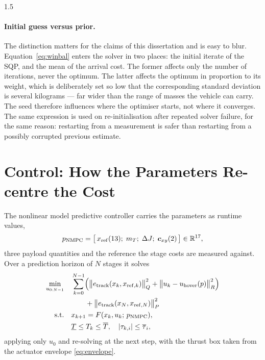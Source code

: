 \begin{spacing}{1.5}
\paragraph{Initial guess versus prior.} The distinction matters for the claims of
this dissertation and is easy to blur. Equation~\eqref{eq:winbal} enters the
solver in two places: the initial iterate of the SQP, and the mean of the arrival
cost. The former affects only the number of iterations, never the optimum. The
latter affects the optimum in proportion to its weight, which is deliberately set
so low that the corresponding standard deviation is several kilograms --- far
wider than the range of masses the vehicle can carry. The seed therefore
influences where the optimiser starts, not where it converges. The same
expression is used on re-initialisation after repeated solver failure, for the
same reason: restarting from a measurement is safer than restarting from a
possibly corrupted previous estimate.

\section{Control: How the Parameters Re-centre the Cost}\label{sec:model:ctrl}

The nonlinear model predictive controller carries the parameters as runtime
values,
\begin{equation}
p_{\mathrm{NMPC}} = \bigl[\, x_{\mathrm{ref}}(13);\; m_T;\; \Delta J;\; \bm{c}_{xy}(2) \,\bigr] \in \mathbb{R}^{17},
\label{eq:pnmpc}
\end{equation}
three payload quantities and the reference the stage costs are measured against.
Over a prediction horizon of $N$ stages it solves
\begin{align}
\min_{u_{0:N-1}} \quad
& \sum_{k=0}^{N-1} \Bigl( \bigl\| e_{\mathrm{track}}(x_k, x_{\mathrm{ref},k}) \bigr\|^2_{Q}
+ \bigl\| u_k - u_{\mathrm{hover}}(p) \bigr\|^2_{R} \Bigr) \nonumber \\
& \qquad + \bigl\| e_{\mathrm{track}}(x_N, x_{\mathrm{ref},N}) \bigr\|^2_{P} \nonumber \\
\mathrm{s.t.} \quad
& x_{k+1} = F(x_k, u_k;\, p_{\mathrm{NMPC}}), \nonumber \\
& \underline{T} \le T_k \le \overline{T}, \quad
  |\tau_{k,i}| \le \overline{\tau}_i ,
\label{eq:nmpc}
\end{align}
applying only $u_0$ and re-solving at the next step, with the thrust box taken
from the actuator envelope \eqref{eq:envelope}.


\end{spacing}
